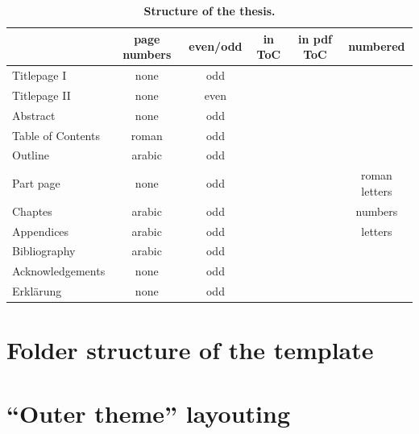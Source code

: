 \begin{table}
	\centering 
	\caption{\textbf{Structure of the thesis.}}
	\label{tab:table2}
	\vspace{5ex}
	\begin{tabular}{lccccc} 
		\toprule
		 & page numbers & even/odd & in ToC & in pdf ToC & numbered  \\ 
		\midrule 
		Titlepage I  & none & odd & \color{bqred}\XSolidBrush& \color{bqgreen} \CheckmarkBold &\color{bqred} \XSolidBrush\\
		Titlepage II & none & even & \color{bqred}\XSolidBrush& \color{bqred}\XSolidBrush& \color{bqred}\XSolidBrush\\
		Abstract & none & odd & \color{bqred}\XSolidBrush& \color{bqgreen}\CheckmarkBold & \color{bqred}\XSolidBrush\\
		Table of Contents & roman & odd & \color{bqred}\XSolidBrush& \color{bqgreen}\CheckmarkBold &\color{bqred} \XSolidBrush\\
		Outline & arabic & odd &\color{bqgreen} \CheckmarkBold &\color{bqgreen} \CheckmarkBold & \color{bqred}\XSolidBrush\\
		Part page & none & odd & \color{bqgreen}\CheckmarkBold & \color{bqgreen}\CheckmarkBold & roman letters\\
		Chaptes & arabic & odd & \color{bqgreen}\CheckmarkBold &\color{bqgreen} \CheckmarkBold & numbers\\
		Appendices & arabic & odd & \color{bqgreen}\CheckmarkBold &\color{bqgreen} \CheckmarkBold & letters\\
		Bibliography & arabic & odd & \color{bqgreen}\CheckmarkBold & \color{bqgreen}\CheckmarkBold & \color{bqred}\XSolidBrush\\
		Acknowledgements & none & odd & \color{bqred}\XSolidBrush& \color{bqgreen}\CheckmarkBold & \color{bqred}\XSolidBrush\\
		Erklärung & none & odd & \color{bqred}\XSolidBrush&\color{bqgreen} \CheckmarkBold & \color{bqred}\XSolidBrush\\
		\bottomrule
	\end{tabular}
\end{table}

\section{Folder structure of the template}


\section{``Outer theme'' layouting}

